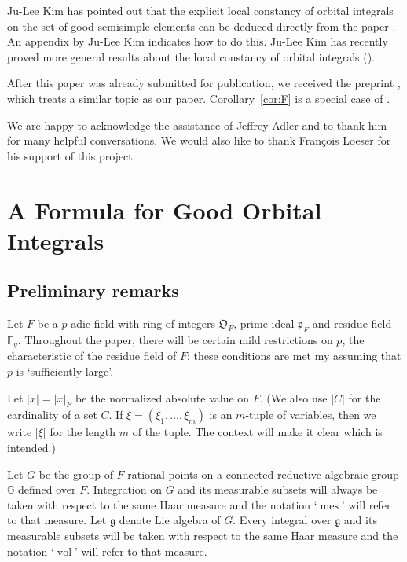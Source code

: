 \documentclass[11pt]{amsart}
\theoremstyle{definition}
\theoremstyle{remark}
\numberwithin{equation}{theorem}
\def\F{{F}}
\def\A{{\mathfrak{O}_\F}}
\def\pFA{{\mathfrak{p}_\F}}
\def\GF{{G}}
\def\gF{{\mathfrak{g}}}
\def\vol{{\operatorname{vol}}}
\def\meas{{\operatorname{mes}}}
\newcommand{\G}{{\mathbb{G}}}
\def\Fq{{\mathbb F}_q}
\def\vol{\operatorname{vol}}
\begin{document}
Ju-Lee Kim has pointed out that the explicit local constancy of
orbital integrals on the set of good semisimple elements can be
deduced directly from the paper \cite{KM}.  An appendix by Ju-Lee
Kim indicates how to do this.  Ju-Lee Kim has recently proved more
general results about the local constancy of orbital integrals
(\cite[Theorem~9.2.2]{KM2}).

After this paper was already submitted for publication, we
received the preprint \cite{WC}, which treats a similar topic as
our paper. Corollary~\ref{cor:F} is a special case of
\cite[thm7.2]{WC}.

We are happy to acknowledge the assistance of Jeffrey Adler and to
thank him for many helpful conversations. We would also like to
thank Fran\c{c}ois Loeser for his support of this project.


\tableofcontents

\section{A Formula for Good Orbital Integrals}\label{section:
formula}

\subsection{Preliminary remarks}\label{section:
preliminaries}

Let $\F$ be a $p$-adic field with ring of integers $\A$, prime
ideal $\pFA$ and residue field $\Fq$.  Throughout the paper, there
will be certain mild restrictions on $p$, the characteristic of
the residue field of $F$; these conditions are met my assuming
that $p$ is `sufficiently large'.

Let $|x| = |x|_F$ be the normalized absolute value on $F$. (We
also use $|C|$ for the cardinality of a set $C$.  If
$\xi=(\xi_1,\ldots,\xi_m)$ is an $m$-tuple of variables, then we
write $|\xi|$ for the length $m$ of the tuple.  The context will
make it clear which is intended.)


Let $\GF$ be the group of $\F$-rational points on a connected
reductive algebraic group $\G$ defined over $\F$. Integration on
$\GF$ and its measurable subsets will always be taken with respect
to the same Haar measure and the notation `$\meas$' will refer to
that measure. Let $\gF$ denote Lie algebra of $\GF$. Every
integral over $\gF$ and its measurable subsets will be taken with
respect to the same Haar measure and the notation `$\vol$' will
refer to that measure.
\end{document}

